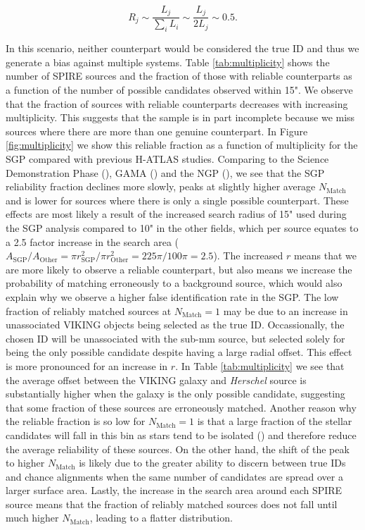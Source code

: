 \begin{equation}
    R_j \sim \frac{L_j}{\sum_i L_i} \sim \frac{L_j}{2L_j} \sim 0.5.
\end{equation}

In this scenario, neither counterpart would be considered the true ID and thus we generate a bias against multiple systems. Table \ref{tab:multiplicity} shows the number of SPIRE sources and the fraction of those with reliable counterparts as a function of the number of possible candidates observed within 15". We observe that the fraction of sources with reliable counterparts decreases with increasing multiplicity. This suggests that the sample is in part incomplete because we miss sources where there are more than one genuine counterpart. In Figure \ref{fig:multiplicity} we show this reliable fraction as a function of multiplicity for the SGP compared with previous H-ATLAS studies. Comparing to the Science Demonstration Phase (\citealt{Fleuren_2012}), GAMA (\citealt{Bourne_2016}) and the NGP (\citealt{Furlanetto_2018}), we see that the SGP reliability fraction declines more slowly, peaks at slightly higher average $N_{\textrm{Match}}$ and is lower for sources where there is only a single possible counterpart. These effects are most likely a result of the increased search radius of 15" used during the SGP analysis compared to 10" in the other fields, which per source equates to a 2.5 factor increase in the search area ($A_{\textrm{SGP}}/A_{\textrm{Other}} = \pi r_{\textrm{SGP}}^2/\pi r_{\textrm{Other}}^2 = 225\pi/100\pi = 2.5$). The increased $r$ means that we are more likely to observe a reliable counterpart, but also means we increase the probability of matching erroneously to a background source, which would also explain why we observe a higher false identification rate in the SGP. The low fraction of reliably matched sources at $N_{\textrm{Match}} = 1$ may be due to an increase in unassociated VIKING objects being selected as the true ID. Occassionally, the chosen ID will be unassociated with the sub-mm source, but selected solely for being the only possible candidate despite having a large radial offset. This effect is more pronounced for an increase in $r$. In Table \ref{tab:multiplicity} we see that the average offset between the VIKING galaxy and \textit{Herschel} source is substantially higher when the galaxy is the only possible candidate, suggesting that some fraction of these sources are erroneously matched. Another reason why the reliable fraction is so low for $N_{\textrm{Match}} = 1$ is that a large fraction of the stellar candidates will fall in this bin as stars tend to be isolated (\citealt{Bourne_2016}) and therefore reduce the average reliability of these sources. On the other hand, the shift of the peak to higher $N_{\textrm{Match}}$ is likely due to the greater ability to discern between true IDs and chance alignments when the same number of candidates are spread over a larger surface area. Lastly, the increase in the search area around each SPIRE source means that the fraction of reliably matched sources does not fall until much higher $N_{\textrm{Match}}$, leading to a flatter distribution.


